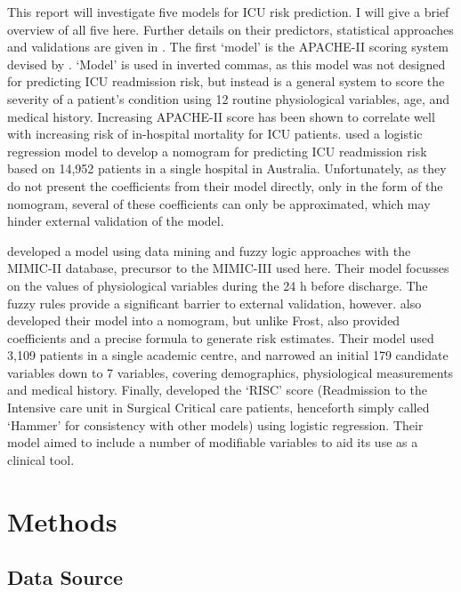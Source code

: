 \documentclass[onecolumn]{article}
\begin{document}
This report will investigate five models for ICU risk prediction. I will give a brief overview of all five here. Further details on their predictors, statistical approaches and validations are given in .
The first `model' is the APACHE-II scoring system devised by \cite{Knaus1985}. `Model' is used in inverted commas, as this model was not designed for predicting ICU readmission risk, but instead is a general system to score the severity of a patient's condition using 12 routine physiological variables, age, and medical history. Increasing APACHE-II score has been shown to correlate well with increasing risk of in-hospital mortality for ICU patients. 
\cite{Frost2010} used a logistic regression model to develop a nomogram for predicting ICU readmission risk based on 14,952 patients in a single hospital in Australia. Unfortunately, as they do not present the coefficients from their model directly, only in the form of the nomogram, several of these coefficients can only be approximated, which may hinder external validation of the model.

\cite{Fialho2012} developed a model using data mining and fuzzy logic approaches with the MIMIC-II database, precursor to the MIMIC-III used here. Their model focusses on the values of physiological variables during the 24 h before discharge. The fuzzy rules provide a significant barrier to external validation, however.
\cite{Martin2018} also developed their model into a nomogram, but unlike Frost, also provided coefficients and a precise formula to generate risk estimates. Their model used 3,109 patients in a single academic centre, and narrowed an initial 179 candidate variables down to 7 variables, covering demographics, physiological measurements and medical history.
Finally, \cite{Hammer2020} developed the `RISC' score (Readmission to the
Intensive care unit in Surgical Critical care patients, henceforth simply called `Hammer' for consistency with other models) using logistic regression. Their model aimed to include a number of modifiable variables to aid its use as a clinical tool.

\section{Methods}

\subsection{Data Source}
\end{document}
